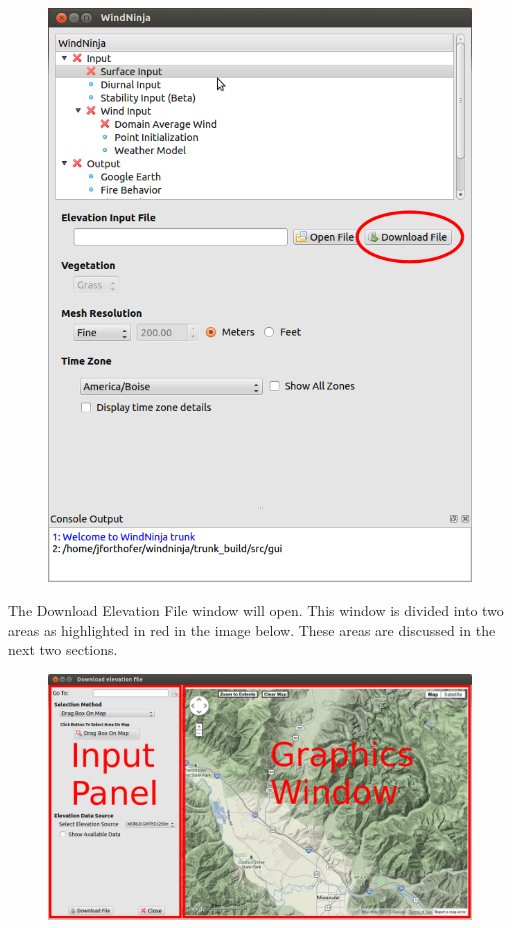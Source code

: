 \documentclass[12pt,oneside,final]{article}
\begin{document}
\begin{figure}[ht!]
    \centering
    \includegraphics[width=5in]{images/download_dem_1.png}
\end{figure}

The Download Elevation File window will open.  This window is divided into two
areas as highlighted in red in the image below.  These areas are discussed in
the next two sections.

\begin{figure}[ht!]
    \centering
    \includegraphics[width=7in]{images/download_dem_2.png}
\end{figure}
\end{document}
